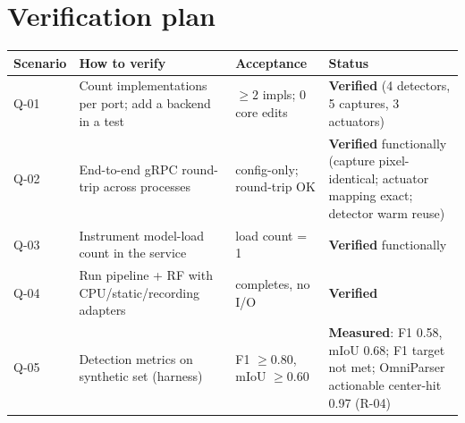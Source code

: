 \documentclass[11pt,a4paper]{report}
\begin{document}
\section{Verification plan}
\begin{longtable}{@{}p{2.0cm}p{5.4cm}p{4.4cm}p{2.2cm}@{}}
\toprule
\textbf{Scenario} & \textbf{How to verify} & \textbf{Acceptance} & \textbf{Status} \\
\midrule
\endhead
Q-01 & Count implementations per port; add a backend in a test & $\geq 2$ impls; 0 core edits & \textbf{Verified} (4 detectors, 5 captures, 3 actuators) \\
Q-02 & End-to-end gRPC round-trip across processes & config-only; round-trip OK & \textbf{Verified} functionally (capture pixel-identical; actuator mapping exact; detector warm reuse) \\
Q-03 & Instrument model-load count in the service & load count = 1 & \textbf{Verified} functionally \\
Q-04 & Run pipeline + RF with CPU/static/recording adapters & completes, no I/O & \textbf{Verified} \\
Q-05 & Detection metrics on synthetic set (harness) & F1 $\geq 0.80$, mIoU $\geq 0.60$ & \textbf{Measured}: F1 0.58, mIoU 0.68; F1 target not met; OmniParser actionable center-hit 0.97 (R-04) \\
\bottomrule
\end{longtable}

\end{document}
